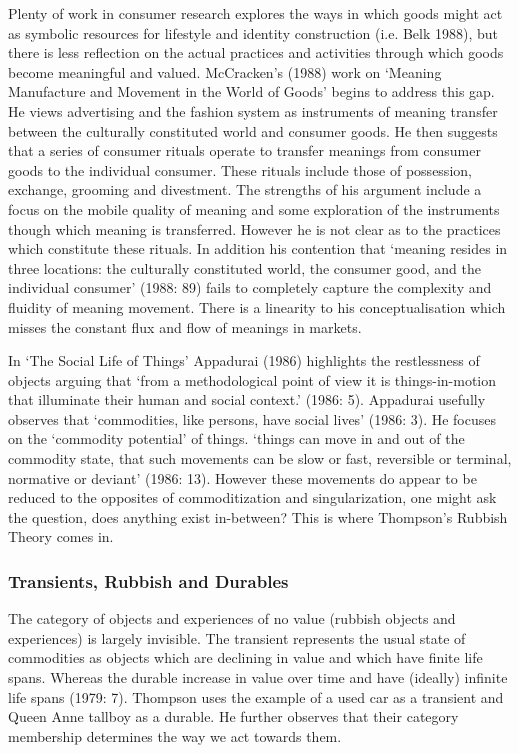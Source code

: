 Plenty of work in consumer research explores the ways in which goods might act as symbolic resources for lifestyle and identity construction (i.e. Belk 1988), but there is less reflection on the actual practices and activities through which goods become meaningful and valued. McCracken’s (1988) work on ‘Meaning Manufacture and Movement in the World of Goods’ begins to address this gap. He views advertising and the fashion system as instruments of meaning transfer between the culturally constituted world and consumer goods. He then suggests that a series of consumer rituals operate to transfer meanings from consumer goods to the individual consumer. These rituals include those of possession, exchange, grooming and divestment. The strengths of his argument include a focus on the mobile quality of meaning and some exploration of the instruments though which meaning is transferred. However he is not clear as to the practices which constitute these rituals. In addition his contention that ‘meaning resides in three locations: the culturally constituted world, the consumer good, and the individual consumer’ (1988: 89) fails to completely capture the complexity and fluidity of meaning movement. There is a linearity to his conceptualisation which misses the constant flux and flow of meanings in markets.

In ‘The Social Life of Things’ Appadurai (1986) highlights the restlessness of objects arguing that ‘from a methodological point of view it is things-in-motion that illuminate their human and social context.’ (1986: 5). Appadurai usefully observes that ‘commodities, like persons, have social lives’ (1986: 3). He focuses on the ‘commodity potential’ of things. ‘things can move in and out of the commodity state, that such movements can be slow or fast, reversible or terminal, normative or deviant’ (1986: 13). However these movements do appear to be reduced to the opposites of commoditization and singularization, one might ask the question, does anything exist in-between? This is where Thompson’s Rubbish Theory comes in.

\subsubsection{Transients, Rubbish and Durables}
The category of objects and experiences of no value (rubbish objects and experiences) is largely invisible. The transient represents the usual state of commodities as objects which are declining in value and which have finite life spans. Whereas the durable increase in value over time and have (ideally) infinite life spans (1979: 7). Thompson uses the example of a used car as a transient and Queen Anne tallboy as a durable. He further observes that their category membership determines the way we act towards them. 

